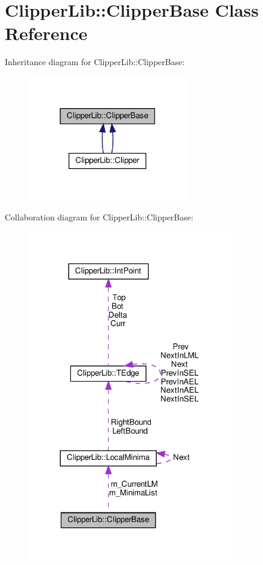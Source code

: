 \hypertarget{classClipperLib_1_1ClipperBase}{}\section{Clipper\+Lib\+:\+:Clipper\+Base Class Reference}
\label{classClipperLib_1_1ClipperBase}


Inheritance diagram for Clipper\+Lib\+:\+:Clipper\+Base\+:
\nopagebreak
\begin{figure}[H]
\begin{center}
\leavevmode
\includegraphics[width=199pt]{classClipperLib_1_1ClipperBase__inherit__graph}
\end{center}
\end{figure}


Collaboration diagram for Clipper\+Lib\+:\+:Clipper\+Base\+:
\nopagebreak
\begin{figure}[H]
\begin{center}
\leavevmode
\includegraphics[width=255pt]{classClipperLib_1_1ClipperBase__coll__graph}
\end{center}
\end{figure}
